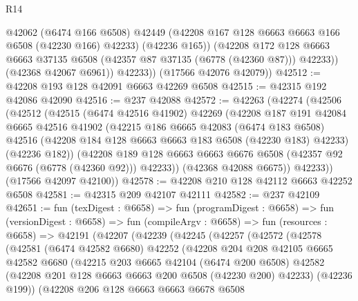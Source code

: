 \begin{lexlean}{R14}
\begin{coremodule}
                @42062
                (@6474 @166 @6508)
                @42449
                (@42208 @167 @128 @6663 @6663 @166 @6508 (@42230 @166) @42233)
                (@42236 @165))
              (@42208
                @172
                @128
                @6663
                @6663
                @37135
                @6508
                (@42357 @87 @37135 (@6778 (@42360 @87)))
                @42233))
            (@42368 @42067 @6961))
          @42233))
      (@17566 @42076 @42079))
@42512 := @42208 @193 @128 @42091 @6663 @42269 @6508
@42515 := @42315 @192 @42086 @42090
@42516 := @237 @42088
@42572 := @42263
    (@42274
      (@42506
        (@42512
          (@42515
            (@6474 @42516 @41902)
            @42269
            (@42208
              @187
              @191
              @42084
              @6665
              @42516
              @41902
              (@42215
                @186
                @6665
                @42083
                (@6474 @183 @6508)
                @42516
                (@42208 @184 @128 @6663 @6663 @183 @6508 (@42230 @183) @42233)
                (@42236 @182))
              (@42208
                @189
                @128
                @6663
                @6663
                @6676
                @6508
                (@42357 @92 @6676 (@6778 (@42360 @92)))
                @42233))
            (@42368 @42088 @6675))
          @42233))
      (@17566 @42097 @42100))
@42578 := @42208 @210 @128 @42112 @6663 @42252 @6508
@42581 := @42315 @209 @42107 @42111
@42582 := @237 @42109
@42651 := fun (texDigest : @6658) =>
  fun (programDigest : @6658) =>
  fun (versionDigest : @6658) =>
  fun (compileArgv : @6658) =>
  fun (resources : @6658) =>
  @42191
    (@42207
      (@42239
        (@42245
          (@42257
            (@42572
              (@42578
                (@42581
                  (@6474 @42582 @6680)
                  @42252
                  (@42208
                    @204
                    @208
                    @42105
                    @6665
                    @42582
                    @6680
                    (@42215
                      @203
                      @6665
                      @42104
                      (@6474 @200 @6508)
                      @42582
                      (@42208 @201 @128 @6663 @6663 @200 @6508 (@42230 @200) @42233)
                      (@42236 @199))
                    (@42208
                      @206
                      @128
                      @6663
                      @6663
                      @6678
                      @6508

\end{coremodule}
\end{lexlean}
